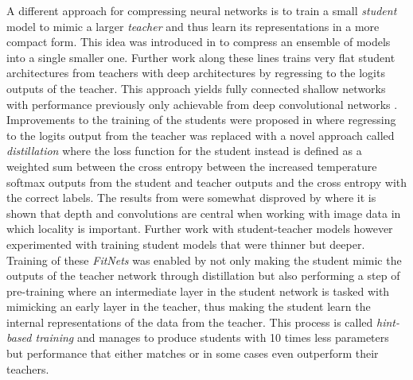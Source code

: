 \documentclass[11pt]{article}
\newcommand{\bibentry}[1]{\cite{#1}}
\begin{document}
A different approach for compressing neural networks is to train a small \emph{student} model to mimic a larger \emph{teacher} and thus learn its representations in a more compact form. This idea was introduced in\bibentry{bucilua2006model} to compress an ensemble of models into a single smaller one. Further work along these lines trains very flat student architectures from teachers with deep architectures by regressing to the logits outputs of the teacher. This approach yields fully connected shallow networks with performance previously only achievable from deep convolutional networks \bibentry{ba2014deep}. Improvements to the training of the students were proposed in\bibentry{hinton2015distilling} where regressing to the logits output from the teacher was replaced with a novel approach called \emph{distillation} where the loss function for the student instead is defined as a weighted sum between the cross entropy between the increased temperature softmax outputs from the student and teacher outputs and the cross entropy with the correct labels. 
The results from\bibentry{ba2014deep} were somewhat disproved by \bibentry{urban2016deep} where it is shown that depth and convolutions are central when working with image data in which locality is important. Further work with student-teacher models however experimented with training student models that were thinner but deeper. Training of these \emph{FitNets} was enabled by not only making the student mimic the outputs of the teacher network through distillation but also performing a step of pre-training where an intermediate layer in the student network is tasked with mimicking an early layer in the teacher, thus making the student learn the internal representations of the data from the teacher\bibentry{romero2014fitnets}. This process is called \emph{hint-based training} and manages to produce students with 10 times less parameters but performance that either matches or in some cases even outperform their teachers.


 

\end{document}
